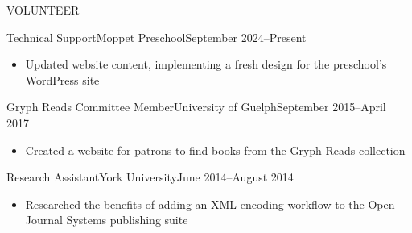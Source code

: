 \documentclass[]{mcdowellcv}
\begin{document}
  \begin{cvsection}{VOLUNTEER}

    \begin{cvsubsection}{Technical Support}{Moppet Preschool}{September 2024--Present}
      \begin{itemize}
        \item Updated website content, implementing a fresh design for the preschool's WordPress site
      \end{itemize}
    \end{cvsubsection}


     \begin{cvsubsection}{Gryph Reads Committee Member}{University of Guelph}{September 2015--April 2017}
   \begin{itemize}
     \item Created a website for patrons to find books from the Gryph Reads collection
   \end{itemize}
 \end{cvsubsection}


     \begin{cvsubsection}{Research Assistant}{York University}{June 2014--August 2014}
   \begin{itemize}
     \item Researched the benefits of adding an XML encoding workflow to the Open Journal Systems publishing suite
   \end{itemize}
 \end{cvsubsection}
\end{cvsection}
\end{document}
